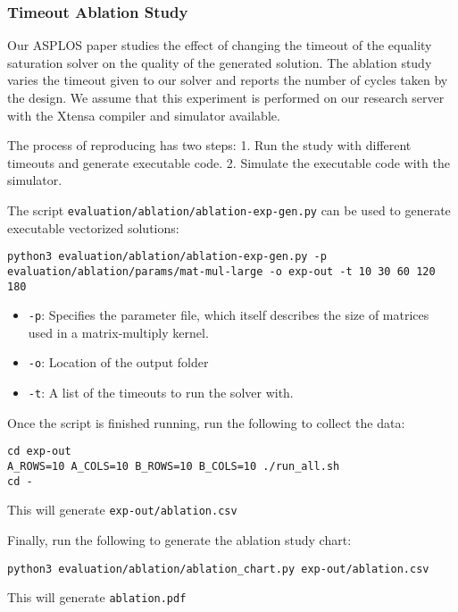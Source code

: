\hypertarget{timeout-ablation-study}{%
\subsubsection{Timeout Ablation Study}\label{timeout-ablation-study}}

Our ASPLOS paper studies the effect of changing the timeout of the
equality saturation solver on the quality of the generated solution. The
ablation study varies the timeout given to our solver and reports the
number of cycles taken by the design. We assume that this experiment is
performed on our research server with the Xtensa compiler and simulator
available.

The process of reproducing has two steps: 1. Run the study with
different timeouts and generate executable code. 2. Simulate the
executable code with the simulator.

The script \texttt{evaluation/ablation/ablation-exp-gen.py} can be used
to generate executable vectorized solutions:

\begin{verbatim}
python3 evaluation/ablation/ablation-exp-gen.py -p evaluation/ablation/params/mat-mul-large -o exp-out -t 10 30 60 120 180
\end{verbatim}

\begin{itemize}
\tightlist
\item
  \texttt{-p}: Specifies the parameter file, which itself describes the
  size of matrices used in a matrix-multiply kernel.
\item
  \texttt{-o}: Location of the output folder
\item
  \texttt{-t}: A list of the timeouts to run the solver with.
\end{itemize}

Once the script is finished running, run the following to collect the
data:

\begin{verbatim}
cd exp-out
A_ROWS=10 A_COLS=10 B_ROWS=10 B_COLS=10 ./run_all.sh
cd -
\end{verbatim}

This will generate \texttt{exp-out/ablation.csv}

Finally, run the following to generate the ablation study chart:

\begin{verbatim}
python3 evaluation/ablation/ablation_chart.py exp-out/ablation.csv
\end{verbatim}

This will generate \texttt{ablation.pdf}
